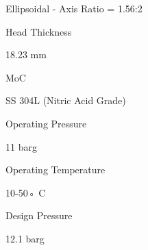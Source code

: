 \documentclass[a4paper,portrait,12pt]{article}
\begin{document}
\begin{flushleft}
Ellipsoidal - Axis Ratio = 1.56:2
\end{flushleft}





\begin{flushleft}
Head Thickness
\end{flushleft}





\begin{flushleft}
18.23 mm
\end{flushleft}





\begin{flushleft}
MoC
\end{flushleft}





\begin{flushleft}
SS 304L (Nitric Acid Grade)
\end{flushleft}





\begin{flushleft}
Operating Pressure
\end{flushleft}





\begin{flushleft}
11 barg
\end{flushleft}





\begin{flushleft}
Operating Temperature
\end{flushleft}





\begin{flushleft}
10-50◦ C
\end{flushleft}





\begin{flushleft}
Design Pressure
\end{flushleft}





\begin{flushleft}
12.1 barg
\end{flushleft}
\end{document}

